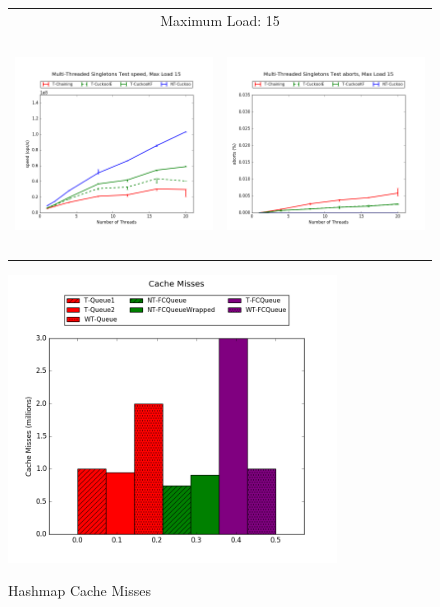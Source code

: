 \begin{figure}[h!]
\begin{tabular}{|cc|}
        \hline 
        \multicolumn{2}{|c|}{{\footnotesize Maximum Load: 15}}\\
        \includegraphics[height=2.25in]{maps/15HM10K:F90,I5,E5speed.png} &
    \includegraphics[height=2.25in]{maps/15HM10K:F90,I5,E5aborts.png}\\
    \hline 
    \end{tabular}
\label{fig:ntqueues}
\end{figure}


\begin{figure}[ht!]
    \caption{Hashmap Cache Misses}
    \centering
    \includegraphics[height=3in]{fcqueues/cm.png}
    \label{fig:cm_maps}
\end{figure}
